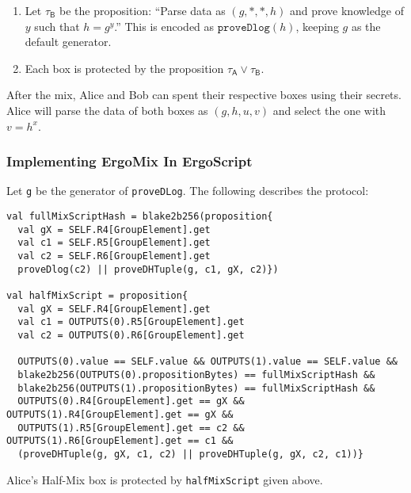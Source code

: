 \documentclass[11pt]{article}
\newcommand{\langname}{ErgoScript\xspace}
\newcommand{\mixname}{ErgoMix\xspace}
\begin{document}
\begin{enumerate}
\begin{enumerate}
		\item Let $\tau_{\textsf{B}}$ be the proposition: ``Parse data as $(g, *, *, h)$ and
		prove knowledge of $y$ such that $h = {g}^{y}$.'' 
		This is encoded as $\texttt{proveDlog}(h)$, keeping $g$ as the default generator.
		
		\item Each box is protected by the proposition $\tau_\textsf{A} \lor \tau_\textsf{B}$. 
		
	\end{enumerate}

\end{enumerate}
	After the mix, Alice and Bob can spent their respective boxes using their secrets. 
	Alice will parse the data of both boxes as $(g, h, u, v)$ and select the one with $v = h^x$. 

\subsubsection{Implementing \mixname In \langname}
Let \texttt{g} be the generator of \texttt{proveDLog}. The following describes the protocol:
\begin{verbatim}
val fullMixScriptHash = blake2b256(proposition{
  val gX = SELF.R4[GroupElement].get
  val c1 = SELF.R5[GroupElement].get
  val c2 = SELF.R6[GroupElement].get
  proveDlog(c2) || proveDHTuple(g, c1, gX, c2)})

val halfMixScript = proposition{
  val gX = SELF.R4[GroupElement].get
  val c1 = OUTPUTS(0).R5[GroupElement].get
  val c2 = OUTPUTS(0).R6[GroupElement].get

  OUTPUTS(0).value == SELF.value && OUTPUTS(1).value == SELF.value &&
  blake2b256(OUTPUTS(0).propositionBytes) == fullMixScriptHash &&
  blake2b256(OUTPUTS(1).propositionBytes) == fullMixScriptHash &&
  OUTPUTS(0).R4[GroupElement].get == gX && OUTPUTS(1).R4[GroupElement].get == gX &&
  OUTPUTS(1).R5[GroupElement].get == c2 && OUTPUTS(1).R6[GroupElement].get == c1 &&
  (proveDHTuple(g, gX, c1, c2) || proveDHTuple(g, gX, c2, c1))}
\end{verbatim}

Alice's Half-Mix box is protected by \texttt{halfMixScript} given above.
\end{document}
